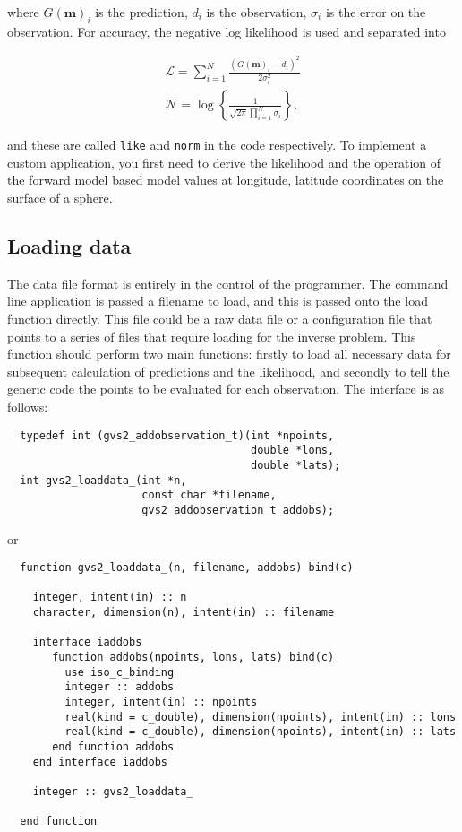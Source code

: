 \documentclass{article}
\begin{document}
where $G(\mathbf{m})_i$ is the prediction, $d_i$ is the observation, $\sigma_i$ is the
error on the observation. For accuracy, the negative log likelihood is used and separated
into

\begin{align}
  \label{eqn:like}
  \mathcal{L} = \sum_{i = 1}^N \frac{(G(\mathbf{m})_i - d_i)^2}{2\sigma_i^2} \\
  \label{eqn:norm}
  \mathcal{N} = \log \left\{ \frac{1}{\sqrt{2 \pi} \prod_{i=1}^N \sigma_i} \right\}
  ,
\end{align}

and these are called {\tt like} and {\tt norm} in the code
respectively. To implement a custom application, you first need to
derive the likelihood and the operation of the forward model based
model values at longitude, latitude coordinates on the surface of a
sphere.

\subsection{Loading data}

The data file format is entirely in the control of the programmer. The command line
application is passed a filename to load, and this is passed onto the load function
directly. This file could be a raw data file or a configuration file that points
to a series of files that require loading for the inverse problem. This function
should perform two main functions: firstly to load all necessary data for subsequent
calculation of predictions and the likelihood, and secondly to tell the generic
code the points to be evaluated for each observation. The interface is as follows:

\begin{verbatim}
  typedef int (gvs2_addobservation_t)(int *npoints,
                                      double *lons,
                                      double *lats);
  int gvs2_loaddata_(int *n,
                     const char *filename,
                     gvs2_addobservation_t addobs);
\end{verbatim}

or

\begin{verbatim}
  function gvs2_loaddata_(n, filename, addobs) bind(c)

    integer, intent(in) :: n
    character, dimension(n), intent(in) :: filename

    interface iaddobs
       function addobs(npoints, lons, lats) bind(c)
         use iso_c_binding
         integer :: addobs
         integer, intent(in) :: npoints
         real(kind = c_double), dimension(npoints), intent(in) :: lons
         real(kind = c_double), dimension(npoints), intent(in) :: lats
       end function addobs
    end interface iaddobs
   
    integer :: gvs2_loaddata_

  end function
\end{verbatim}
\end{document}
